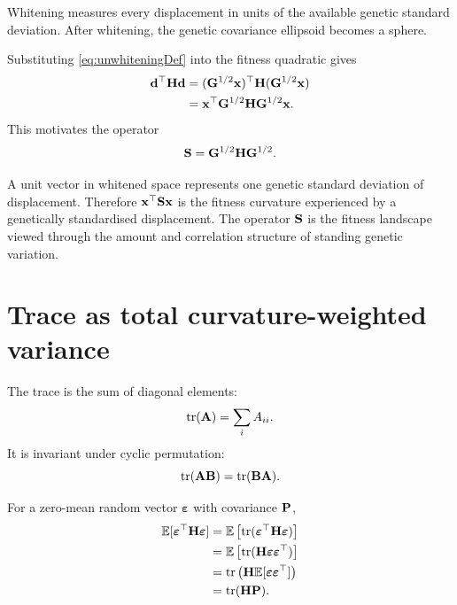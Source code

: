 \inwords Whitening measures every displacement in units of the available genetic standard deviation. After whitening, the genetic covariance ellipsoid becomes a sphere.

Substituting \cref{eq:unwhiteningDef} into the fitness quadratic gives
\begin{align}
\mathbf d^\top\mathbf{H}\mathbf d
&=(\mathbf{G}^{1/2}\mathbf x)^\top\mathbf{H}(\mathbf{G}^{1/2}\mathbf x)\\
&=\mathbf x^\top\mathbf{G}^{1/2}\mathbf{H}\mathbf{G}^{1/2}\mathbf x.
\end{align}
This motivates the operator
\begin{equation}
\mathbf{S}=\mathbf{G}^{1/2}\mathbf{H}\mathbf{G}^{1/2}.
\label{eq:SdefinitionEarly}
\end{equation}

\begin{geombox}
A unit vector in whitened space represents one genetic standard deviation of displacement. Therefore \(\mathbf x^\top\mathbf{S}\mathbf x\) is the fitness curvature experienced by a genetically standardised displacement. The operator \(\mathbf{S}\) is the fitness landscape viewed through the amount and correlation structure of standing genetic variation.
\end{geombox}

\section{Trace as total curvature-weighted variance}

The trace is the sum of diagonal elements:
\begin{equation}
\operatorname{tr}(\mathbf A)=\sum_iA_{ii}.
\end{equation}
It is invariant under cyclic permutation:
\begin{equation}
\operatorname{tr}(\mathbf A\mathbf B)=\operatorname{tr}(\mathbf B\mathbf A).
\end{equation}

For a zero-mean random vector \(\boldsymbol\varepsilon\) with covariance \(\mathbf{P}\),
\begin{align}
\mathbb E[\boldsymbol\varepsilon^\top\mathbf{H}\boldsymbol\varepsilon]
&=\mathbb E\left[\operatorname{tr}(\boldsymbol\varepsilon^\top\mathbf{H}\boldsymbol\varepsilon)\right]\\
&=\mathbb E\left[\operatorname{tr}(\mathbf{H}\boldsymbol\varepsilon\boldsymbol\varepsilon^\top)\right]\\
&=\operatorname{tr}\left(\mathbf{H}\mathbb E[\boldsymbol\varepsilon\boldsymbol\varepsilon^\top]\right)\\
&=\operatorname{tr}(\mathbf{H}\mathbf{P}).
\label{eq:traceQuadraticExpectation}
\end{align}


